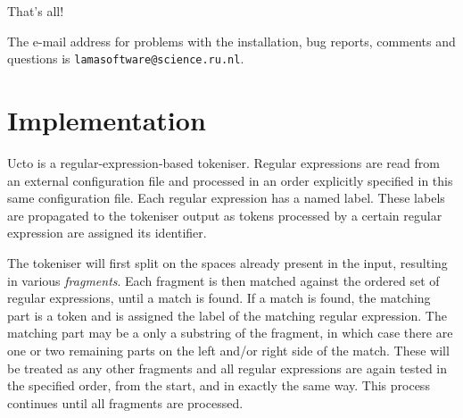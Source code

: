 \documentclass[a4paper,12pt]{report}
\begin{document}
That's all!

The e-mail address for problems with the installation, bug reports,
comments and questions is {\tt lamasoftware@science.ru.nl}.




\chapter{Implementation}
\label{implementation}

Ucto is a regular-expression-based tokeniser. Regular expressions are read from an external configuration file and processed in an order explicitly specified in this same configuration file. Each regular expression has a named label. These labels are propagated to the tokeniser output as tokens processed by a certain regular expression are assigned its identifier.

The tokeniser will first split on the spaces already present in the input, resulting in various \emph{fragments}. Each fragment is then matched against the ordered set of regular expressions, until a match is found. If a match is found, the matching part is a token and is assigned the label of the matching regular expression. The matching part may be a only a substring of the fragment, in which case there are one or two remaining parts on the left and/or right side of the match. These will be treated as any other fragments and all regular expressions are again tested in the specified order, from the start, and in exactly the same way. This process continues until all fragments are processed. 
\end{document}
